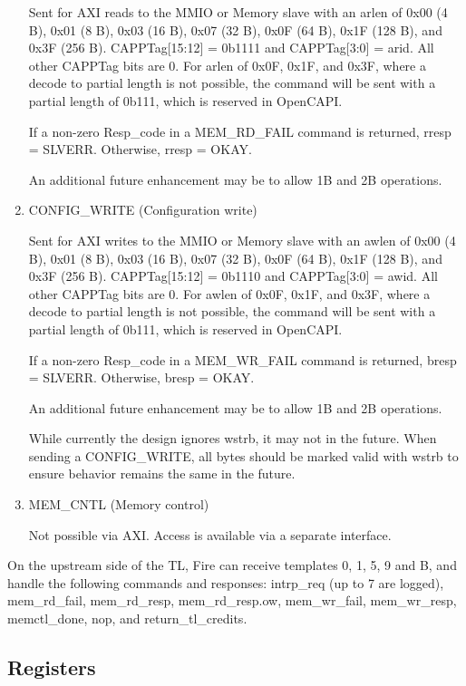 \begin{enumerate}
  Sent for AXI reads to the MMIO or Memory slave with an arlen of 0x00
  (4 B), 0x01 (8 B), 0x03 (16 B), 0x07 (32 B), 0x0F (64 B), 0x1F (128
  B), and 0x3F (256 B). CAPPTag[15:12] = 0b1111 and CAPPTag[3:0] =
  arid. All other CAPPTag bits are 0. For arlen of 0x0F, 0x1F, and
  0x3F, where a decode to partial length is not possible, the command
  will be sent with a partial length of 0b111, which is reserved in
  OpenCAPI.

  If a non-zero Resp\_code in a MEM\_RD\_FAIL command is returned,
  rresp = SLVERR. Otherwise, rresp = OKAY.

  An additional future enhancement may be to allow 1B and 2B
  operations.

\item{CONFIG\_WRITE (Configuration write)}

  Sent for AXI writes to the MMIO or Memory slave with an awlen of
  0x00 (4 B), 0x01 (8 B), 0x03 (16 B), 0x07 (32 B), 0x0F (64 B), 0x1F
  (128 B), and 0x3F (256 B). CAPPTag[15:12] = 0b1110 and CAPPTag[3:0]
  = awid. All other CAPPTag bits are 0. For awlen of 0x0F, 0x1F, and
  0x3F, where a decode to partial length is not possible, the command
  will be sent with a partial length of 0b111, which is reserved in
  OpenCAPI.

  If a non-zero Resp\_code in a MEM\_WR\_FAIL command is returned,
  bresp = SLVERR. Otherwise, bresp = OKAY.

  An additional future enhancement may be to allow 1B and 2B
  operations.

  While currently the design ignores wstrb, it may not in the
  future. When sending a CONFIG\_WRITE, all bytes should be marked
  valid with wstrb to ensure behavior remains the same in the future.

\item{MEM\_CNTL (Memory control)}

  Not possible via AXI. Access is available via a separate interface.

\end{enumerate}

On the upstream side of the TL, Fire can receive templates 0, 1, 5, 9
and B, and handle the following commands and responses: intrp\_req (up
to 7 are logged), mem\_rd\_fail, mem\_rd\_resp, mem\_rd\_resp.ow,
mem\_wr\_fail, mem\_wr\_resp, memctl\_done, nop, and
return\_tl\_credits.

\subsection{Registers}


